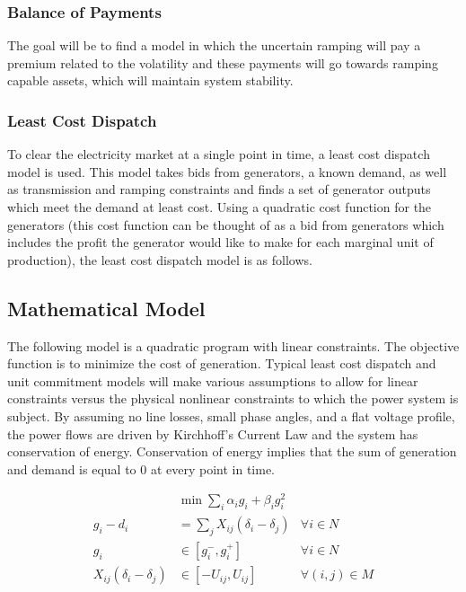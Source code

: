 \subsubsection{Balance of Payments}
	The goal will be to find a model in which the uncertain ramping will pay a premium related to the volatility and these payments will go towards ramping capable assets, which will maintain system stability.

\subsubsection{Least Cost Dispatch}
To clear the electricity market at a single point in time, a least cost dispatch model is used.  This model takes bids from generators, a known demand, as well as transmission and ramping constraints and finds a set of generator outputs which meet the demand at least cost.  Using a quadratic cost function for the generators (this cost function can be thought of as a bid from generators which includes the profit the generator would like to make for each marginal unit of production), the least cost dispatch model is as follows. 

\subsection{Mathematical Model}
The following model is a quadratic program with linear constraints.  The objective function is to minimize the cost of generation.  Typical least cost dispatch and unit commitment models will make various assumptions to allow for linear constraints versus the physical nonlinear constraints to which the power system is subject.  By assuming no line losses, small phase angles, and a flat voltage profile, the power flows are driven by Kirchhoff’s Current Law and the system has conservation of energy.  Conservation of energy implies that the sum of generation and demand is equal to 0 at every point in time.

\begin{subequations}
\begin{align}
& \min  \sum_i \alpha_i g_i + \beta_i g_i^2	&	\\
g_i - d_i &= \sum_j X_{ij} (\delta_i - \delta_j)	&	\forall i \in N 	\\
g_i  &\in \left[ g_i^- , g_i^+ \right]		&	\forall i \in N 	\\
X_{ij} ( \delta_i - \delta_j ) &\in \left[ -U_{ij}, U_{ij} \right]	&	\forall (i,j) \in M 
\end{align}
\label{leastcostdispatch}
\end{subequations}


